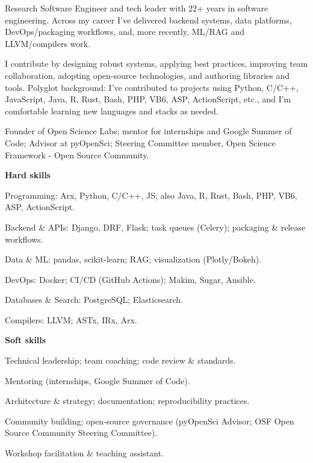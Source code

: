 \documentclass[10pt,a4paper]{article}
\begin{document}
\StartCVColumns


\small
Research Software Engineer and tech leader with 22+ years in software engineering. Across my career I've delivered backend systems, data platforms, DevOps/packaging workflows, and, more recently, ML/RAG and LLVM/compilers work.

I contribute by designing robust systems, applying best practices, improving team collaboration, adopting open-source technologies, and authoring libraries and tools. Polyglot background: I've contributed to projects using Python, C/C++, JavaScript, Java, R, Rust, Bash, PHP, VB6, ASP, ActionScript, etc., and I'm comfortable learning new languages and stacks as needed.

Founder of Open Science Labs; mentor for internships and Google Summer of Code; Advisor at pyOpenSci; Steering Committee member, Open Science Framework - Open Source Community.
\normalsize


\small
\textbf{Hard skills}
\begin{tightitemize}
  \item Programming: Arx, Python, C/C++, JS; also Java, R, Rust, Bash, PHP, VB6, ASP, ActionScript.
  \item Backend \& APIs: Django, DRF, Flask; task queues (Celery); packaging \& release workflows.
  \item Data \& ML: pandas, scikit-learn; RAG; visualization (Plotly/Bokeh).
  \item DevOps: Docker; CI/CD (GitHub Actions); Makim, Sugar, Ansible.
  \item Databases \& Search: PostgreSQL; Elasticsearch.
  \item Compilers: LLVM; ASTx, IRx, Arx.
\end{tightitemize}

\textbf{Soft skills}
\begin{tightitemize}
  \item Technical leadership; team coaching; code review \& standards.
  \item Mentoring (internships, Google Summer of Code).
  \item Architecture \& strategy; documentation; reproducibility practices.
  \item Community building; open-source governance (pyOpenSci Advisor; OSF Open Source Community Steering Committee).
  \item Workshop facilitation \& teaching assistant.
\end{tightitemize}
\end{document}
